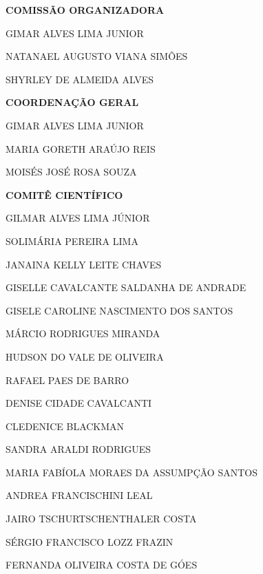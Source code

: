 \documentclass[a4paper,12pt,twoside,onesidepapers,%
  electronic,%
  papers=final,%
  headers=allpages,%
	onecoltoc,
	tocnum=right,
	twocolindex,
	movepagenumber=true,%
hyperref={bookmarksdepth=1,bookmarksopen,bookmarksopenlevel=0,%
 linkcolor=black,urlcolor=blue}, %
  geometry={text={175truemm,226truemm},%
    inner=0.69in,top=25mm,bottom=28mm,footskip=10.4mm,voffset=0mm},%
]{confproc}
\begin{document}
\begin{center}

\begin{multicols}{2}

\noindent \textbf{COMISSÃO ORGANIZADORA}
\vspace{0.1in}

GIMAR ALVES LIMA JUNIOR

NATANAEL AUGUSTO VIANA SIMÕES

SHYRLEY DE ALMEIDA ALVES

\noindent \textbf{COORDENAÇÃO GERAL}
\vspace{0.1in}

GIMAR ALVES LIMA JUNIOR

MARIA GORETH ARAÚJO REIS

MOISÉS JOSÉ ROSA SOUZA

\end{multicols}

\vspace*{0.2in}

\noindent \textbf{COMITÊ CIENTÍFICO}

\begin{multicols}{2}

\begin{flushright}
	
GILMAR ALVES LIMA JÚNIOR

SOLIMÁRIA PEREIRA LIMA

JANAINA KELLY LEITE CHAVES

GISELLE CAVALCANTE SALDANHA DE ANDRADE

GISELE CAROLINE NASCIMENTO DOS SANTOS

MÁRCIO RODRIGUES MIRANDA

HUDSON DO VALE DE OLIVEIRA

RAFAEL PAES DE BARRO

DENISE CIDADE CAVALCANTI

\end{flushright}

\begin{flushleft}

CLEDENICE BLACKMAN

SANDRA ARALDI RODRIGUES

MARIA FABÍOLA MORAES DA ASSUMPÇÃO SANTOS

ANDREA FRANCISCHINI LEAL

JAIRO TSCHURTSCHENTHALER COSTA

SÉRGIO FRANCISCO LOZZ FRAZIN

FERNANDA OLIVEIRA COSTA DE GÓES


\end{flushleft}
\end{multicols}
\end{center}
\end{document}
